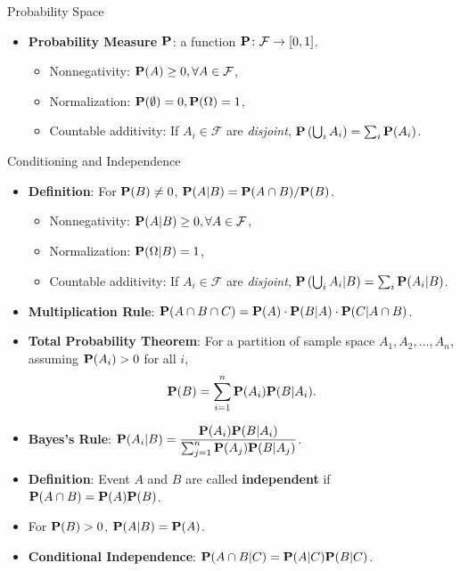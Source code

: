 \documentclass[landscape,a4paper]{article}
\begin{document}
\begin{cheatsheetcolumns}
\begin{card}{Probability Space}
\begin{itemize}
				\item \textbf{Probability Measure $\mathbf{P}$}: a function $\mathbf{P} \colon \mathcal F\to [0,1]$.
				\begin{itemize}
					\item Nonnegativity: $\mathbf{P}(A)\ge 0,\forall A\in\mathcal F$,
					\item Normalization: $\mathbf{P}(\emptyset)=0,\mathbf{P}(\Omega)=1$,
					\item Countable additivity: If $A_i\in\mathcal F$ are \textit{disjoint}, $\mathbf{P}\left(\bigcup_i A_i\right)=\sum_i\mathbf{P}(A_i)$.
				\end{itemize}
			\end{itemize}
		\end{card}
		\begin{card}{Conditioning and Independence}
			\begin{itemize}
				\item \textbf{Definition}: For $\mathbf{P}(B)\neq 0$, $\mathbf{P}(A|B)=\mathbf{P}(A\cap B)/\mathbf{P}(B)$.
				\begin{itemize}
					\item Nonnegativity: $\mathbf{P}(A|B)\ge 0,\forall A\in\mathcal F$,
					\item Normalization: $\mathbf{P}(\Omega|B)=1$,
					\item Countable additivity: If $A_i\in\mathcal F$ are \textit{disjoint}, $\mathbf{P}\left(\bigcup_i A_i|B\right)=\sum_i\mathbf{P}(A_i|B)$.
				\end{itemize}
				\item \textbf{Multiplication Rule}: $\mathbf{P}(A\cap B\cap C)=\mathbf{P}(A)\cdot\mathbf{P}(B|A)\cdot\mathbf{P}(C|A\cap B)$.
				\item \textbf{Total Probability Theorem}: For a partition of sample space $A_1, A_2,\dots, A_n$, assuming $\mathbf{P}(A_i)>0$ for all $i$,
				\[
				\mathbf{P}(B)=\sum_{i=1}^n \mathbf{P}(A_i)\mathbf{P}(B|A_i).
				\]
				\item \textbf{Bayes's Rule}: $\mathbf{P}(A_i|B)=\dfrac{\mathbf{P}(A_i)\mathbf{P}(B|A_i)}{\sum_{j=1}^n\mathbf{P}(A_j)\mathbf{P}(B|A_j)}$.
			\end{itemize}
			\begin{itemize}
			\item \textbf{Definition}: Event $A$ and $B$ are called \textbf{independent} if $\mathbf{P}(A\cap B)=\mathbf{P}(A)\mathbf{P}(B)$.
			\item For $\mathbf{P}(B)>0$, $\mathbf{P}(A|B)=\mathbf{P}(A)$.
			\item \textbf{Conditional Independence}: $\mathbf{P}(A\cap B|C)=\mathbf{P}(A|C)\mathbf{P}(B|C)$.

\end{itemize}
\end{card}
\end{cheatsheetcolumns}
\end{document}
